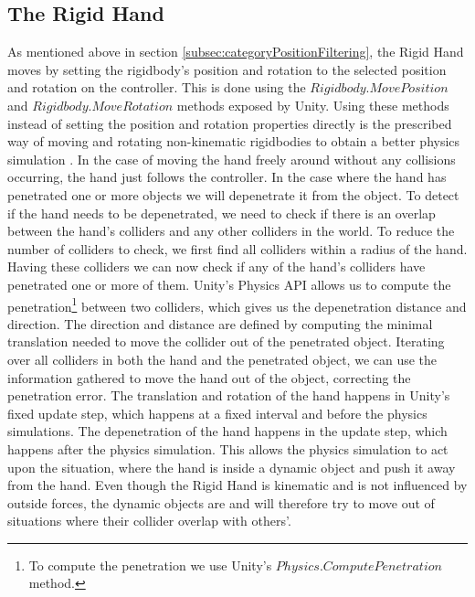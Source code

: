 \subsection{The Rigid Hand}
\label{subsec:rigidHand}
As mentioned above in section \ref{subsec:categoryPositionFiltering}, the Rigid Hand moves by setting the rigidbody's position and rotation to the selected position and rotation on the controller. This is done using the $Rigidbody.MovePosition$ and $Rigidbody.MoveRotation$ methods exposed by Unity. Using these methods instead of setting the position and rotation properties directly is the prescribed way of moving and rotating non-kinematic rigidbodies to obtain a better physics simulation \parencite{UnityMovePosition2017}. In the case of moving the hand freely around without any collisions occurring, the hand just follows the controller. In the case where the hand has penetrated one or more objects we will depenetrate it from the object. To detect if the hand needs to be depenetrated, we need to check if there is an overlap between the hand's colliders and any other colliders in the world. To reduce the number of colliders to check, we first find all colliders within a radius of the hand. Having these colliders we can now check if any of the hand's colliders have penetrated one or more of them. Unity's Physics API allows us to compute the penetration\footnote{To compute the penetration we use Unity's $Physics.ComputePenetration$ method.} between two colliders, which gives us the depenetration distance and direction. The direction and distance are defined by computing the minimal translation needed to move the collider out of the penetrated object. Iterating over all colliders in both the hand and the penetrated object, we can use the information gathered to move the hand out of the object, correcting the penetration error. The translation and rotation of the hand happens in Unity's fixed update step, which happens at a fixed interval and before the physics simulations. The depenetration of the hand happens in the update step, which happens after the physics simulation. This allows the physics simulation to act upon the situation, where the hand is inside a dynamic object and push it away from the hand. Even though the Rigid Hand is kinematic and is not influenced by outside forces, the dynamic objects are and will therefore try to move out of situations where their collider overlap with others'.

